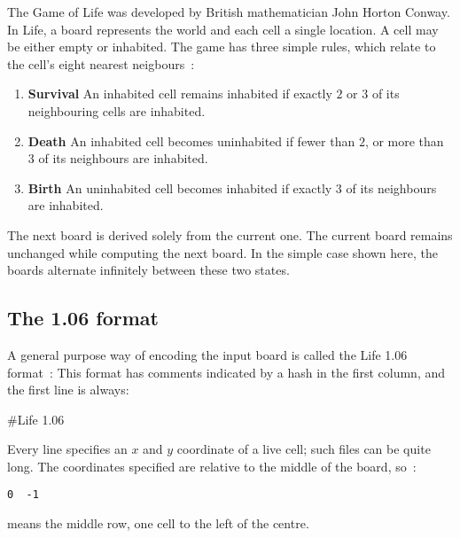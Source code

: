 


The Game of Life was developed by British mathematician
John Horton Conway. In Life, a board represents the world
and each cell a single location. A cell may be either empty
or inhabited. The game has three simple rules, which relate to the
cell's eight nearest neigbours~:
\begin{enumerate}
\item {\bf Survival} An inhabited cell remains inhabited if
exactly $2$ or $3$ of its neighbouring cells are inhabited.
\item {\bf Death} An inhabited cell becomes uninhabited if 
fewer than $2$, or more than $3$ of its neighbours are inhabited.
\item {\bf Birth} An uninhabited cell becomes inhabited if exactly
$3$ of its neighbours are inhabited.
\end{enumerate}

The next board is derived solely from the current one. The current board
remains unchanged while computing the next board.  In the simple case
shown here, the boards alternate infinitely between these two states.

\begin{center}
\end{center}

\subsection*{The 1.06 format}

A general purpose way of encoding the input board is
called the Life 1.06 format~:
This format has comments indicated by a hash in the first column,
and the first line is always:
\begin{terminaloutput}
#Life 1.06
\end{terminaloutput}
Every line specifies an $x$ and $y$ coordinate of a live cell;
such files can be quite long.
The coordinates specified are relative to the middle of the board,
so~:
\begin{verbatim}
0  -1
\end{verbatim}
means the middle row, one cell to the left of the centre.

